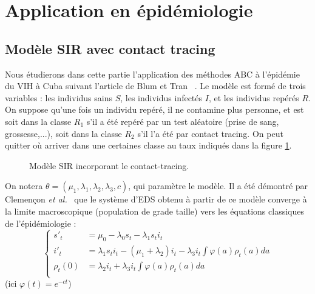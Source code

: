 \documentclass{article}
\theoremstyle{definition}
\begin{document}
\section{Application en épidémiologie}

\subsection{Modèle SIR avec contact tracing}

Nous étudierons dans cette partie l'application des méthodes ABC à l'épidémie du VIH à Cuba suivant l'article de Blum et Tran ~\cite{BlumTran}. Le modèle est formé de trois variables : les individus sains $S$, les individus infectés $I$, et les individus repérés $R$. On suppose qu'une fois un individu repéré, il ne contamine plus personne, et est soit dans la classe $R_1$ s'il a été repéré par un test aléatoire (prise de sang, grossesse,...), soit dans la classe $R_2$ s'il l'a été par contact tracing. On peut quitter où arriver dans une certaines classe au taux indiqués dans la figure \ref{SIR}.\\
\begin{figure}[!h]\centering
{}
\caption{Modèle SIR incorporant le contact-tracing.}
\label{SIR}
\end{figure}

On notera $\theta=(\mu_1,\lambda_1,\lambda_2,\lambda_3,c)$, qui paramètre le modèle. Il a été démontré par Clemençon \textit{et al.}~\cite{Clemencon} que le système d'EDS obtenu à partir de ce modèle converge à la limite macroscopique (population de grade taille) vers les équations classiques de l'épidémiologie :
\[\left\{\begin{array}{rl} s'_t& = \mu_0-\lambda_0 s_t -\lambda_1 s_t i_t \\
                       i'_t  & =\lambda_1 s_t i_t -(\mu_1+\lambda_2)i_t -\lambda_3i_t\int \varphi (a) \rho_t(a) da \\
		\rho_t(0) &= \lambda_2 i_t +\lambda_3 i_t \int \varphi (a) \rho_t(a) da  \\
\end{array}\right.\]
(ici $\varphi(t)=e^{-ct}$)\\
\end{document}

